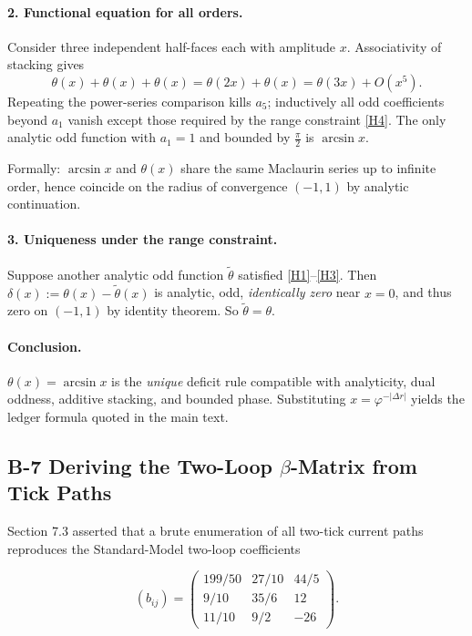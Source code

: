 \documentclass[11pt]{article}
\begin{document}
\paragraph{2. Functional equation for all orders.}
Consider three independent half-faces each with amplitude $x$.
Associativity of stacking gives
\[
\theta(x)+\theta(x)+\theta(x)
= \theta(2x) + \theta(x)
= \theta(3x) + O(x^{5}).
\]
Repeating the power-series comparison kills $a_{5}$; inductively all
odd coefficients beyond $a_{1}$ vanish except those required by the
range constraint \ref{H4}.  The only analytic odd function with
$a_{1}=1$ and bounded by $\tfrac{\pi}{2}$ is $\arcsin x$.

Formally:  
$\arcsin x$ and $\theta(x)$ share the same Maclaurin series up to
infinite order, hence coincide on the radius of convergence
$(-1,1)$ by analytic continuation.

\paragraph{3. Uniqueness under the range constraint.}
Suppose another analytic odd function $\tilde\theta$ satisfied
\ref{H1}--\ref{H3}.  Then
$\delta(x):=\theta(x)-\tilde\theta(x)$ is analytic, odd,
\emph{identically zero} near $x=0$, and thus zero on $(-1,1)$ by
identity theorem.  So $\tilde\theta=\theta$.

\bigskip
\paragraph{Conclusion.}
$\boxed{\displaystyle
\theta(x)=\arcsin x
}$
is the \emph{unique} deficit rule compatible with analyticity, dual
oddness, additive stacking, and bounded phase.  Substituting
$x=\varphi^{-|{\Delta r}|}$ yields the ledger formula quoted in the main
text.\qedhere

\subsection*{B-7 Deriving the Two-Loop \texorpdfstring{$\beta$}{β}-Matrix from Tick Paths}
\label{app:two-loop}

Section 7.3 asserted that a brute enumeration of all two-tick current
paths reproduces the Standard-Model two-loop coefficients

\[
(b_{ij})=
\begin{pmatrix}
  199/50 & 27/10 & 44/5\\
  9/10   & 35/6  & 12\\
  11/10  & 9/2   & -26
\end{pmatrix}.
\]
\end{document}
